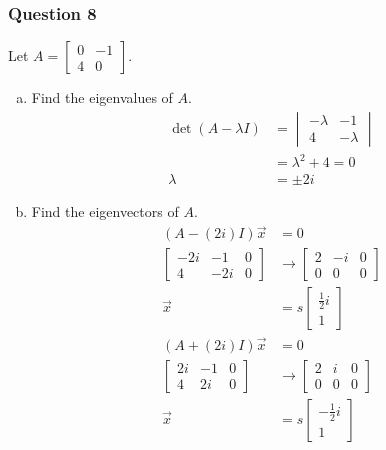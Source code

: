 \documentclass{math}
\begin{document}
\subsubsection*{Question 8}
Let \( A = \begin{bmatrix}0 & -1 \\ 4 & 0\end{bmatrix} \).
\begin{enumerate}[(a)]
  \item Find the eigenvalues of \( A \).
  \begin{align*}
    \det(A-\lambda I) &= \begin{vmatrix}
      -\lambda & -1 \\
      4 & -\lambda
    \end{vmatrix} \\
    &= \lambda^2+4 = 0 \\
    \lambda &= \pm2i
  \end{align*}
  \item Find the eigenvectors of \( A \).
  \begin{align*}
    (A-(2i)I)\vec{x} &= 0 \\
    \left[\begin{array}{cc|c}
      -2i & -1 & 0 \\
      4 & -2i & 0
    \end{array}\right] &\to \left[\begin{array}{cc|c}
      2 & -i & 0 \\
      0 & 0 & 0
    \end{array}\right] \\
    \vec{x} &= s\begin{bmatrix}\frac{1}{2}i \\ 1\end{bmatrix} \\
    (A+(2i)I)\vec{x} &= 0 \\
    \left[\begin{array}{cc|c}
      2i & -1 & 0 \\
      4 & 2i & 0
    \end{array}\right] &\to \left[\begin{array}{cc|c}
      2 & i & 0 \\
      0 & 0 & 0
    \end{array}\right] \\
    \vec{x} &= s\begin{bmatrix}-\frac{1}{2}i \\ 1\end{bmatrix}
  \end{align*}
\end{enumerate}
\end{document}
